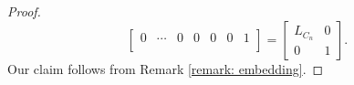 \documentclass[11pt,reqno]{amsart}
\theoremstyle{definition}
\theoremstyle{plain}
\begin{document}
\begin{proof}
\[\begin{bmatrix}
	0 & \cdots & 0 & 0 & 0 & 0 & 1 \\ 
\end{bmatrix} = \left[ \begin{array}{c|c}
L_{C_n} & 0 \\
\hline
0 & 1
\end{array} \right].
\]
Our claim follows from Remark \ref{remark: embedding}. 
\end{proof}
\end{document}
